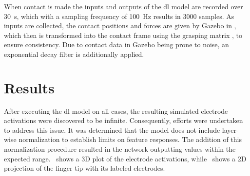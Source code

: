 When contact is made the inputs and outputs of the \gls{dl} model are recorded over \SI{30}{\second}, which with a sampling frequency of \SI{100}{\hertz} results in \num{3000} samples. As inputs are collected, the contact positions and forces are given by Gazebo in , which then is transformed into the contact frame  using the grasping matrix , to ensure consistency. Due to contact data in Gazebo being prone to noise, an exponential decay filter is additionally applied.




\section{Results}\label{sec:1-tactile-perception-results}

After executing the \gls{dl} model on all cases, the resulting simulated electrode activations were discovered to be infinite. Consequently, efforts were undertaken to address this issue. It was determined that the model does not include layer-wise normalization to establish limits on feature responses. The addition of this normalization procedure resulted in the network outputting values within the expected range.~ shows a 3D plot of the electrode activations, while~ shows a 2D projection of the finger tip with its labeled electrodes.

